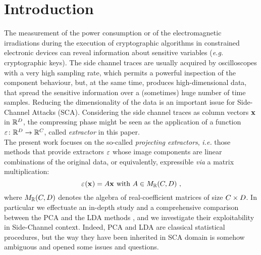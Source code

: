 \section{Introduction}
The measurement of the power consumption or of the electromagnetic irradiations during the execution of cryptographic algorithms in constrained electronic devices can reveal information about sensitive variables ({\em e.g.} cryptographic keys). The side channel traces are usually acquired by oscilloscopes with a very high sampling rate, which permits a powerful inspection of the component behaviour, but, at the same time, produces high-dimensional data, that spread the sensitive information over a (sometimes) huge number of time samples. Reducing the dimensionality of the data is an important issue for Side-Channel Attacks (SCA). Considering the side channel traces as column vectors ${\bf x}$ in $\mathbb{R}^\traceLength$, the compressing phase might be seen as the application of a function $\extract\colon \mathbb{R}^\traceLength\rightarrow \mathbb{R}^\newTraceLength$, called {\em extractor} in this paper.\\

The present work focuses on the so-called {\em projecting extractors}, {\em i.e.} those methods that provide extractors $\extract$ whose image components are linear combinations of the original data, or equivalently, expressible {\em via} a matrix multiplication:
\begin{equation}\label{eq:linearExtractor}
\extractor{\sss[]{}} = A\sss[]{} \mbox{ with } A \in M_{\mathbb{R}}(\newTraceLength, \traceLength) \mbox{ ,}
\end{equation}
where $ M_{\mathbb{R}}(\newTraceLength, \traceLength)$ denotes the algebra of real-coefficient matrices of size $\newTraceLength \times \traceLength$.  In particular we effectuate an in-depth study and a comprehensive comparison  between the PCA and the LDA methods \cite{fisher1938statistical,Fukunaga}, and we investigate their exploitability  in Side-Channel context.  Indeed, PCA and LDA are classical statistical procedures, but the way they have been inherited in SCA domain is somehow ambiguous and opened some issues and questions.\\

